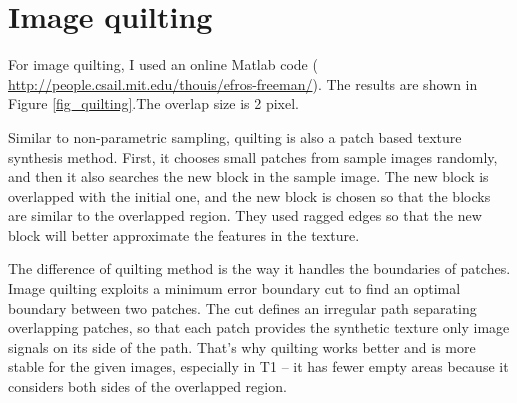 \documentclass{extarticle}
\theoremstyle{definition}
\theoremstyle{definition}
\begin{document}
\section{Image quilting}
For image quilting, I used an online Matlab code ( \hyperlink{http://people.csail.mit.edu/thouis/efros-freeman/}{http://people.csail.mit.edu/thouis/efros-freeman/}). The results are shown in Figure \ref{fig_quilting}.The overlap size is 2 pixel.

Similar to non-parametric sampling, quilting is also a patch based texture synthesis method. First, it chooses small patches from sample images randomly, and then it also searches the new block in the sample image. The new block is overlapped with the initial one, and the new block is chosen so that the blocks are similar to the overlapped region. They used ragged edges so that the new block will better approximate the features in the texture.

The difference of quilting method is the way it handles the boundaries of patches. Image quilting exploits a minimum error boundary cut to find an optimal boundary between two patches. The cut defines an irregular path separating overlapping patches, so that each patch provides the synthetic texture only image signals on its side of the path. That's why quilting works better and is more stable for the given images, especially in T1 -- it has fewer empty areas because it considers both sides of the overlapped region.
\end{document}
